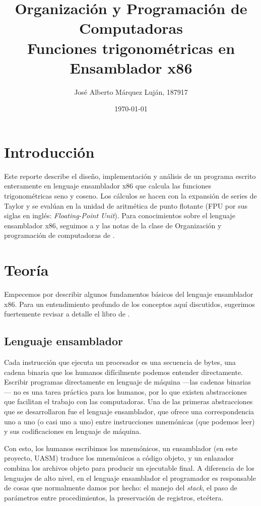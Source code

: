 \documentclass[12pt]{article}
\title{
  Organización y Programación de Computadoras \\
  \large Funciones trigonométricas en Ensamblador x86
}
\author{José Alberto Márquez Luján, 187917}
\date{\today}
\begin{document}


\newpage
\section{Introducción}

Este reporte describe el diseño, implementación y análisis de un programa
escrito enteramente en lenguaje ensamblador x86 que calcula las funciones
trigonométricas seno y coseno. Los cálculos se hacen con la expansión de series
de Taylor y se evalúan en la unidad de aritmética de punto flotante (FPU por
sus siglas en inglés: \textit{Floating-Point Unit}). Para conocimientos sobre
el lenguaje ensamblador x86, seguimos a \textcite{IrvineBook} y las notas de la
clase de Organización y programación de computadoras de \textcite{RamonRios}.

\section{Teoría}

Empecemos por describir algunos fundamentos básicos del lenguaje ensamblador
x86. Para un entendimiento profundo de los conceptos aquí discutidos, sugerimos
fuertemente revisar a detalle el libro de \textcite{IrvineBook}.

\subsection{Lenguaje ensamblador}

Cada instrucción que ejecuta un procesador es una secuencia de bytes, una
cadena binaria que los humanos difícilmente podemos entender directamente.
Escribir programas directamente en lenguaje de máquina ---las cadenas
binarias--- no es una tarea práctica para los humanos, por lo que existen
abstracciones que facilitan el trabajo con las computadoras. Una de las
primeras abstracciones que se desarrollaron fue el lenguaje ensamblador, que
ofrece una correspondencia uno a uno (o casi uno a uno) entre instrucciones
mnemónicas (que podemos leer) y sus codificaciones en lenguaje de máquina.

Con esto, los humanos escribimos los mnemónicos, un ensamblador (en este
proyecto, UASM) traduce los mnemónicos a código objeto, y un enlazador combina
los archivos objeto para producir un ejecutable final. A diferencia de los
lenguajes de alto nivel, en el lenguaje ensamblador el programador es
responsable de cosas que normalmente damos por hecho: el manejo del
\textit{stack}, el paso de parámetros entre procedimientos, la preservación de
registros, etcétera.
\end{document}
